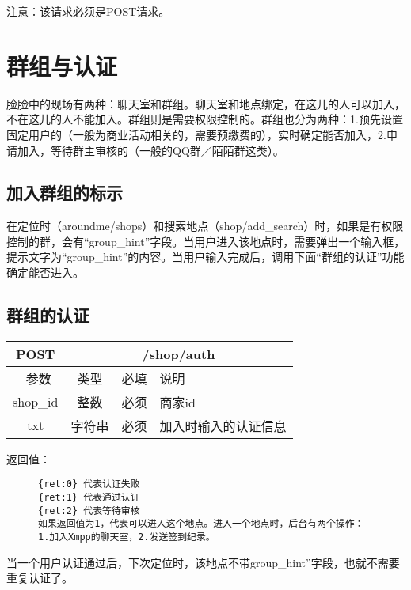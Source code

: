 \documentclass[cs4size]{ctexartutf8}
\begin{document}
注意：该请求必须是POST请求。


\section{群组与认证}
脸脸中的现场有两种：聊天室和群组。聊天室和地点绑定，在这儿的人可以加入，不在这儿的人不能加入。群组则是需要权限控制的。群组也分为两种：1.预先设置固定用户的（一般为商业活动相关的，需要预缴费的），实时确定能否加入，2.申请加入，等待群主审核的（一般的QQ群／陌陌群这类）。

\subsection{加入群组的标示}
在定位时（aroundme/shops）和搜索地点（shop/add\_search）时，如果是有权限控制的群，会有“group\_hint”字段。当用户进入该地点时，需要弹出一个输入框，提示文字为“group\_hint”的内容。当用户输入完成后，调用下面“群组的认证”功能确定能否进入。


\subsection{群组的认证}
\begin{table}[H]
   \begin{center}
\begin{tabular}{|c|c|c|p{12cm}|}
\hline
POST & \multicolumn{3}{|c|}{/shop/auth} \\
\hline\hline
 \  参数  & 类型 & 必填 &  说明  \\
   \hline
 shop\_id  & 整数 & 必须 & 商家id\\ 
  \hline
 txt  & 字符串 & 必须 & 加入时输入的认证信息\\
 \hline
\end{tabular}
   \end{center}
\end{table}

返回值：
\begin{figure}[H]
\begin{verbatim}
{ret:0} 代表认证失败
{ret:1} 代表通过认证
{ret:2} 代表等待审核
如果返回值为1，代表可以进入这个地点。进入一个地点时，后台有两个操作：1.加入Xmpp的聊天室，2.发送签到纪录。
\end{verbatim}
\end{figure}

当一个用户认证通过后，下次定位时，该地点不带group\_hint”字段，也就不需要重复认证了。





\end{document}
